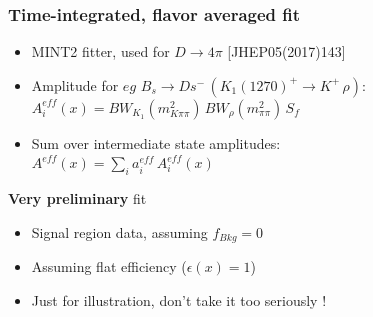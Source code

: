 \documentclass{beamer}
\begin{document}
\begin{frame}
	\frametitle{Time-integrated, flavor averaged fit}

	\centering
	
	\begin{block}{}
	\begin{itemize}
		\item MINT2 fitter, used for $D \rightarrow 4 \pi$ [JHEP05(2017)143]
		\item Amplitude for $eg$ $B_s \to Ds^{-} \, ( K_1(1270)^{+} \to K^{+} \, \rho )$: 
		\\ $A^{eff}_i(x) = BW_{K_1}(m^{2}_{K\pi\pi}) \, BW_{\rho}(m^2_{\pi\pi}) \,  S_f$
		\item Sum over intermediate state amplitudes: 
		\\ $A^{eff}(x) = \sum_i a^{eff}_i \, A^{eff}_i(x)$
	\end{itemize}
	\end{block}	
	
	\begin{block}{\textbf{Very preliminary} fit}
	\begin{itemize}
		\item Signal region data, assuming $f_{Bkg} = 0$
		\item Assuming flat efficiency ($\epsilon(x) = 1$)
		\item Just for illustration, don't take it too seriously !
	\end{itemize}
	\end{block}
				
\end{frame}
\end{document}
